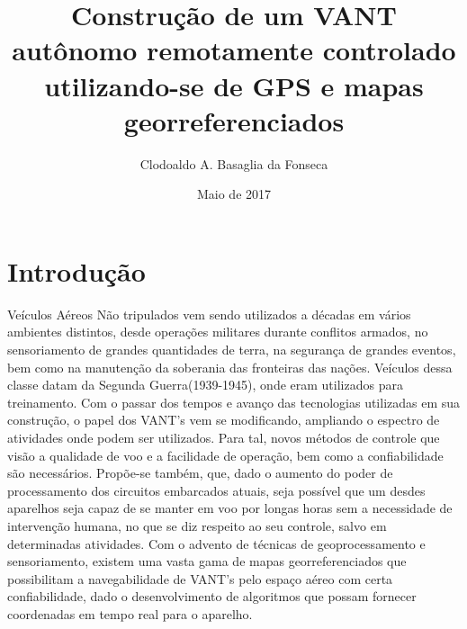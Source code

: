 \documentclass{article}
\title{Construção de um VANT autônomo remotamente controlado utilizando-se de GPS e mapas georreferenciados}
\author{Clodoaldo A. Basaglia da Fonseca }
\date{Maio de 2017}
\begin{document}
\maketitle

\section{Introdução}
Veículos Aéreos Não tripulados vem sendo utilizados a décadas em vários ambientes distintos, desde operações militares durante conflitos armados, no sensoriamento de grandes quantidades de terra, na segurança de grandes eventos, bem como na manutenção da soberania das fronteiras das nações. Veículos dessa classe datam da Segunda Guerra(1939-1945), onde eram utilizados para treinamento. Com o passar dos tempos e avanço das tecnologias utilizadas em sua construção, o papel dos VANT's vem se modificando, ampliando o espectro de atividades onde podem ser utilizados. Para tal, novos métodos de controle que visão a qualidade de voo e a facilidade de operação, bem como a confiabilidade são necessários. Propõe-se também, que, dado o aumento do poder de processamento dos circuitos embarcados atuais, seja possível que um desdes aparelhos seja capaz de se manter em voo por longas horas sem a necessidade de intervenção humana, no que se diz respeito ao seu controle, salvo em determinadas atividades. Com o advento de técnicas de geoprocessamento e sensoriamento, existem uma vasta gama de mapas georreferenciados que possibilitam a navegabilidade de VANT's pelo espaço aéreo com certa confiabilidade, dado o desenvolvimento de algoritmos que possam fornecer coordenadas em tempo real para o aparelho.
\end{document}
